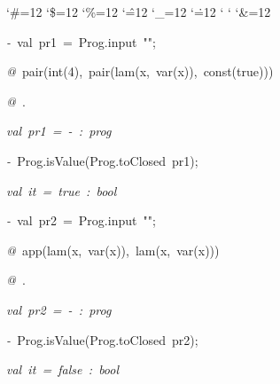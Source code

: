 \begin{list}{}
{\setlength{\leftmargin}{\leftmargini}
\setlength{\rightmargin}{0cm}
\setlength{\itemindent}{0cm}
\setlength{\listparindent}{0cm}
\setlength{\itemsep}{0cm}
\setlength{\parsep}{0cm}
\setlength{\labelsep}{0cm}
\setlength{\labelwidth}{0cm}
\catcode`\#=12
\catcode`\$=12
\catcode`\%=12
\catcode`\^=12
\catcode`\_=12
\catcode`\.=12
\catcode`
\catcode`
\catcode`\&=12
\ttfamily}
\small
\item[]\textsl{-\ }val\ pr1\ =\ Prog.input\ "";
\item[]\textsl{@\ }pair(int(4),\ pair(lam(x,\ var(x)),\ const(true)))
\item[]\textsl{@\ }.
\item[]\textsl{val\ pr1\ =\ -\ :\ prog}
\item[]\textsl{-\ }Prog.isValue(Prog.toClosed\ pr1);
\item[]\textsl{val\ it\ =\ true\ :\ bool}
\item[]\textsl{-\ }val\ pr2\ =\ Prog.input\ "";
\item[]\textsl{@\ }app(lam(x,\ var(x)),\ lam(x,\ var(x)))
\item[]\textsl{@\ }.
\item[]\textsl{val\ pr2\ =\ -\ :\ prog}
\item[]\textsl{-\ }Prog.isValue(Prog.toClosed\ pr2);
\item[]\textsl{val\ it\ =\ false\ :\ bool}
\end{list}
